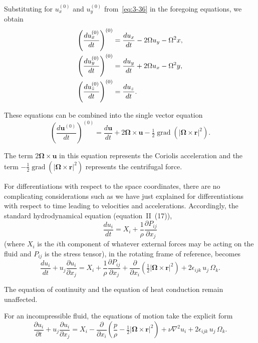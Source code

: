 Substituting for $u_x^{(0)}$ and $u_y^{(0)}$ from~\eqref{eq:3-36} in the foregoing equations, we obtain
\begin{align}
\left(\frac{du_x^{(0)}}{dt}\right)^{(0)} &= \frac{du_x}{dt} - 2\Omega u_y - \Omega^2 x, \label{eq:3-40}\\
\left(\frac{du_y^{(0)}}{dt}\right)^{(0)} &= \frac{du_y}{dt} + 2\Omega u_x - \Omega^2 y, \notag\\
\left(\frac{du_z^{(0)}}{dt}\right)^{(0)} &= \frac{du_z}{dt}. \notag
\end{align}

These equations can be combined into the single vector equation
\begin{equation}\label{eq:3-41}
\left(\frac{d\mathbf{u}^{(0)}}{dt}\right)^{(0)} = \frac{d\mathbf{u}}{dt} + 2\boldsymbol{\Omega}\times\mathbf{u} - \tfrac{1}{2}\operatorname{grad}(|\boldsymbol{\Omega}\times\mathbf{r}|^2).
\end{equation}

The term $2\boldsymbol{\Omega}\times\mathbf{u}$ in this equation represents the Coriolis acceleration and the term $-\frac{1}{2}\operatorname{grad}(|\boldsymbol{\Omega}\times\mathbf{r}|^2)$ represents the centrifugal force.

For differentiations with respect to the space coordinates, there are no complicating considerations such as we have just explained for differentiations with respect to time leading to velocities and accelerations. Accordingly, the standard hydrodynamical equation (equation~II~(17)),
\begin{equation}\label{eq:3-42}
\frac{du_i}{dt} = X_i + \frac{1}{\rho}\frac{\partial P_{ij}}{\partial x_j}
\end{equation}
(where $X_i$ is the $i$th component of whatever external forces may be acting on the fluid and $P_{ij}$ is the stress tensor), in the rotating frame of reference, becomes
\begin{equation}\label{eq:3-43}
\frac{du_i}{dt} + u_j\frac{\partial u_i}{\partial x_j} = X_i + \frac{1}{\rho}\frac{\partial P_{ij}}{\partial x_j} + \frac{\partial}{\partial x_i}\!\left(\tfrac{1}{2}|\boldsymbol{\Omega}\times\mathbf{r}|^2\right) + 2\epsilon_{ijk}\, u_j\,\Omega_k.
\end{equation}

The equation of continuity and the equation of heat conduction remain unaffected.

For an incompressible fluid, the equations of motion take the explicit form
\begin{equation}\label{eq:3-44}
\frac{\partial u_i}{\partial t} + u_j\frac{\partial u_i}{\partial x_j} = X_i - \frac{\partial}{\partial x_i}\!\left(\frac{p}{\rho} - \tfrac{1}{2}|\boldsymbol{\Omega}\times\mathbf{r}|^2\right) + \nu\nabla^2 u_i + 2\epsilon_{ijk}\, u_j\,\Omega_k.
\end{equation}

